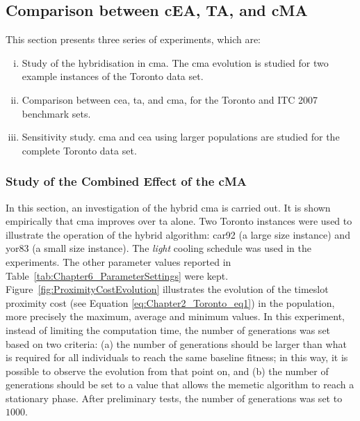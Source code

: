 %
%
\subsection{Comparison between cEA, TA, and cMA}
\label{sec:Comparison_cEA_TA_cEAHybrid}

This section presents three series of experiments, which are:
\begin{enumerate}[i.]
	
	\item Study of the hybridisation in \gls{cma}. The \gls{cma} evolution is studied for two example instances of the Toronto data set.
	
	\item Comparison between \gls{cea}, \gls{ta}, and \gls{cma}, for the Toronto and ITC 2007 benchmark sets.
	
	\item Sensitivity study. \gls{cma} and \gls{cea} using larger populations are studied for the complete Toronto data set.
	
\end{enumerate}




%
%
\subsubsection{Study of the Combined Effect of the cMA}
\label{sec:cMACombinedEffect}

In this section, an investigation of the hybrid \gls{cma} is carried out. It is shown empirically that \gls{cma} improves over \gls{ta} alone. Two Toronto instances were used to illustrate the operation of the hybrid algorithm: car92 (a large size instance) and yor83 (a small size instance). The \emph{light} cooling schedule was used in the experiments. The other parameter values reported in Table~\ref{tab:Chapter6_ParameterSettings} were kept. Figure~\ref{fig:ProximityCostEvolution} illustrates the evolution of the timeslot proximity cost (see Equation \eqref{eq:Chapter2_Toronto_eq1}) in the population, more precisely the maximum, average and minimum values. In this experiment, instead of limiting the computation time, the number of generations was set based on two criteria: (a) the number of generations should be larger than what is required for all individuals to reach the same baseline fitness; in this way, it is possible to observe the evolution from that point on, and (b) the number of generations should be set to a value that allows the memetic algorithm to reach a stationary phase. After preliminary tests, the number of generations was set to $\num{1000}$.


